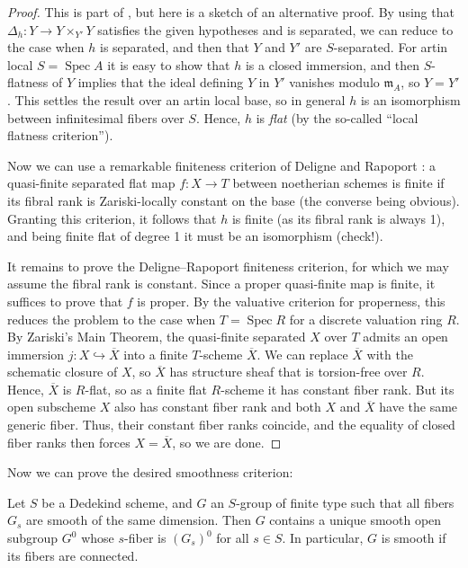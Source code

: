 \documentclass[10pt]{article}
\renewcommand{\(}{\left(}
\renewcommand{\)}{\right)}
\newcommand{\Spec}{\operatorname{Spec}}
\numberwithin{thm}{subsection}
\begin{document}
\begin{proof}
This is part of \cite[IV$_4$, 17.9.5]{ega}, but here is a sketch of
an alternative proof.  By using that $\Delta_h:Y \rightarrow Y \times_{Y'} Y$ satisfies
the given hypotheses and is separated, we can reduce to the case when
$h$ is separated, and then that $Y$ and $Y'$ are $S$-separated.
For artin local $S = \Spec A$ it is easy to 
show that $h$ is a closed immersion, and then $S$-flatness of $Y$
implies that the ideal defining $Y$ in $Y'$ vanishes modulo $\mathfrak{m}_A$, so $Y = Y'$.
This settles the result over an artin local base, so in general
$h$ is an isomorphism between infinitesimal fibers over $S$.  Hence,
$h$ is {\em flat} (by the so-called ``local flatness criterion''). 

Now we can use a remarkable finiteness criterion of Deligne 
and Rapoport \cite[II, 1.19]{dr}:  
a quasi-finite separated flat map $f:X \rightarrow T$ between noetherian schemes 
is finite if its fibral rank is Zariski-locally constant on the base (the converse
being obvious). Granting
this criterion, it follows that $h$ is finite (as its fibral rank is always 1),
and being finite flat of degree 1 it must be an isomorphism (check!).

It remains to prove the Deligne--Rapoport finiteness criterion, for which we may
assume the fibral rank is constant.  
Since a proper quasi-finite map is finite, it suffices to prove that
$f$ is proper.  By the valuative criterion for properness, this
reduces the problem to the case when $T = \Spec R$ for
a discrete valuation ring $R$. 
By Zariski's Main Theorem, the quasi-finite separated $X$ over $T$ admits an open
immersion $j:X \hookrightarrow \overline{X}$ into a finite $T$-scheme $\overline{X}$.
We can replace $\overline{X}$ with the schematic closure of $X$, so
$\overline{X}$ has structure sheaf that is torsion-free over $R$.
Hence, $\overline{X}$ is $R$-flat, so as a finite
flat $R$-scheme it has constant fiber rank.
But its open subscheme $X$ also has constant fiber
rank and both $X$ and $\overline{X}$ have the same generic fiber.
Thus, their constant fiber ranks coincide, and the equality of closed
fiber ranks then forces $X = \overline{X}$, so we are done.
\end{proof}

Now we can prove the desired smoothness criterion:

\begin{prop}\label{gsmooth}
 Let $S$ be a Dedekind scheme, and $G$ an $S$-group of finite type such that 
all fibers $G_s$ are smooth of the same dimension.  Then $G$ contains
a unique smooth open subgroup $G^0$ whose $s$-fiber is $(G_s)^0$ for all $s \in S$.
In particular, $G$ is smooth if its fibers are connected.
\end{prop}
\end{document}
